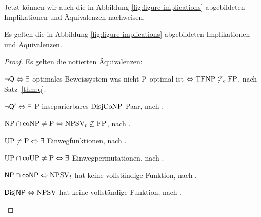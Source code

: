 Jetzt können wir auch die in Abbildung \ref{fig:figure-implications} abgebildeten Implikationen und Äquivalenzen nachweisen.
\begin{theorem}\label{thm:figure-implications}
    Es gelten die in Abbildung \ref{fig:figure-implications} abgebildeten Implikationen und Äquivalenzen.
\end{theorem}
\begin{proof}
    Es gelten die notierten Äquivalenzen:
    \begin{Prooflist}[nosep,midpenalty=0,label={\arabic*.},labelsep=3pt]
    \item $\neg\hQ \Leftrightarrow \exists$ optimales Beweissystem was nicht $\P$-optimal ist $\Leftrightarrow \TFNP\not\subseteq_\mathrm{c} \FP$, nach Satz~\ref{thm:q}.
    \item $\neg\hQ' \Leftrightarrow\exists$ P-inseparierbares $\DisjCoNP$-Paar, nach \textcite[Lemma~2.12, vgl. Appendix]{fortnow_separability_1993}.
    \item $\NP\cap\coNP\neq\P \Leftrightarrow \NPSV_t\not\subseteq\FP$, nach \textcite[Prop.~1]{fenner_inverting_2003}.
    \item $\UP\neq\P \Leftrightarrow\exists$ Einwegfunktionen, nach \textcite[Thm.~10]{grollmann_complexity_1988}.
    \item $\UP\cap\coUP\neq\P \Leftrightarrow\exists$ Einwegpermutationen, nach \textcite{homan_one-way_2003}.
    \item $\hNPcoNP \Leftrightarrow \NPSV_t$ hat keine vollständige Funktion, nach \textcite[Prop.~3]{beyersdorff_nondeterministic_2009}.
    \item $\hDisjNP \Leftrightarrow \NPSV$ hat keine vollständige Funktion, nach \textcite[Thm.~9]{glaser_reductions_2005}.
    \end{Prooflist}


\end{proof}
